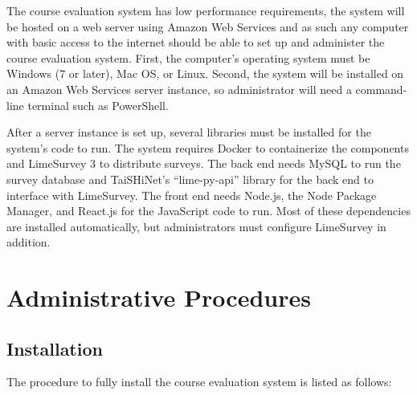 \documentclass{article}
\begin{document}
The course evaluation system has low performance requirements, the system will be hosted on a web server using Amazon Web Services and as such any computer with basic access to the internet should be able to set up and administer the course evaluation system.  First, the computer's operating system must be Windows (7 or later), Mac OS, or Linux. Second, the system will be installed on an Amazon Web Services server instance, so administrator will need a command-line terminal such as PowerShell.

After a server instance is set up, several libraries must be installed for the system's code to run. The system requires Docker to containerize the components and LimeSurvey 3 to distribute surveys. The back end needs MySQL to run the survey database and TaiSHiNet's ``lime-py-api'' library for the back end to interface with LimeSurvey. The front end needs Node.js, the Node Package Manager, and React.js for the JavaScript code to run. Most of these dependencies are installed automatically, but administrators must configure LimeSurvey in addition.

\section{Administrative Procedures}

\subsection{Installation}

The procedure to fully install the course evaluation system is listed as follows:
\end{document}
